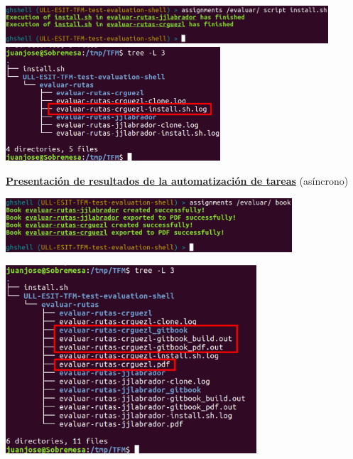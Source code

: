 \documentclass{beamer}
\begin{document}
\begin{frame}[allowframebreaks]
  \begin{center}
  	\includegraphics[width=0.9\textwidth]{images/ghshell7-1.eps}
  	\newline
  	\newline
  	\includegraphics[width=0.6\textwidth]{images/ghshell7-2e.eps}
  \end{center}
  \framebreak
  
  \underline{{\bfseries Presentación de resultados de la automatización de tareas}} (asíncrono)
  \bigskip
  
  \begin{center}
  	\includegraphics[width=0.8\textwidth]{images/ghshell8-1.eps}
  	\newline
  	\newline
  	
  	\framebreak
  	\includegraphics[width=0.7\textwidth]{images/ghshell8-2e.eps}
  	
  	\framebreak
  \end{center}
  

\end{frame}
\end{document}
